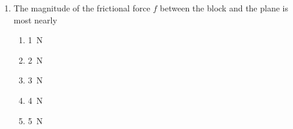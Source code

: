 \documentclass{../../../oss-apphys}
\begin{document}
\begin{multicols}{2}
\begin{enumerate}[resume,leftmargin=18pt]
  \item The magnitude of the frictional force $f$ between the block and the
    plane is most nearly
    \begin{enumerate}[nosep,leftmargin=18pt,label=(\Alph*)]
    \item\SI{1}{\newton}
    \item\SI{2}{\newton}
    \item\SI{3}{\newton}
    \item\SI{4}{\newton}
    \item\SI{5}{\newton}
    \end{enumerate}
    \label{fk}
    \columnbreak

    


\end{enumerate}
\end{multicols}
\end{document}
